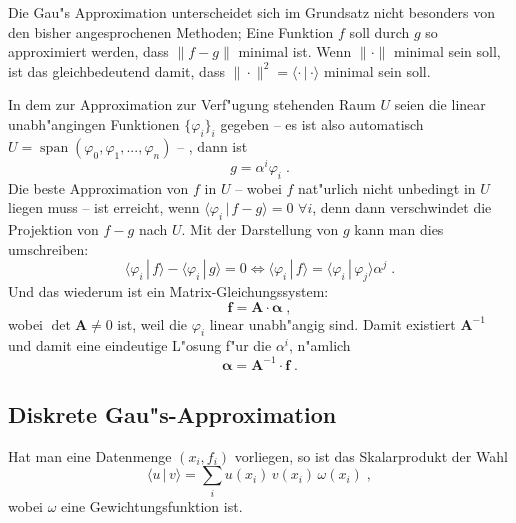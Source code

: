 \documentclass[a4paper]{book}
\renewcommand{\vec}[1]{\ensuremath{\boldsymbol{#1}}}
\newcommand{\Mat}[1]{\ensuremath{\mathbf{#1}}}
\newcommand{\gdw}{\ensuremath{\Leftrightarrow}}
\begin{document}
Die Gau"s Approximation unterscheidet sich im Grundsatz nicht
besonders von den bisher angesprochenen Methoden; Eine Funktion $f$
soll durch $g$ so approximiert werden, dass $\|f-g\|$ minimal
ist. Wenn $\|\cdot\|$ minimal sein soll, ist das gleichbedeutend
damit, dass $\|\cdot\|^2 = \langle \cdot \,|\,\cdot  \rangle$ minimal
sein soll.

In dem zur Approximation zur Verf"ugung stehenden Raum $U$ seien die
linear unabh"angingen Funktionen $\{\varphi_i\}_i$ gegeben -- es ist
also automatisch $U = \operatorname{span}(\varphi_0,\varphi_1, ..., \varphi_n)$
-- , dann ist
\begin{equation*}
  g = \alpha^i \varphi_i \;.
\end{equation*}
Die beste Approximation von $f$ in $U$ -- wobei $f$ nat"urlich nicht
unbedingt in $U$ liegen muss -- ist erreicht, wenn $\langle \varphi_i
\,|\, f-g  \rangle = 0$ $\forall i$, denn dann verschwindet die Projektion von
$f-g$ nach $U$. Mit der Darstellung von $g$ kann man dies umschreiben:
\begin{equation}
  \label{eq:40}
  \langle \varphi_i \,|\, f \rangle - \langle \varphi_i \,|\,g\rangle
  = 0 \gdw
\langle \varphi_i \,|\, f \rangle = \langle \varphi_i \,|\, \varphi_j
\rangle \alpha^j \;.
\end{equation}
Und das wiederum ist ein Matrix-Gleichungssystem:
\begin{equation*}
  \vec f = \Mat A \cdot \vec \alpha \;,
\end{equation*}
wobei $\det\Mat A \neq 0$ ist, weil die $\varphi_i$ linear unabh"angig
sind. Damit existiert $\Mat A^{-1}$ und damit eine eindeutige L"osung
f"ur die $\alpha^i$, n"amlich
\begin{equation*}
  \vec \alpha = \Mat A^{-1} \cdot \vec f \;.
\end{equation*}



\subsection{Diskrete Gau"s-Approximation}
\label{sec:diskrete_gaus_approximation}

Hat man eine Datenmenge $(x_i, f_i)$ vorliegen, so ist das
Skalarprodukt der Wahl
\begin{equation}
  \label{eq:41}
  \langle u \,|\, v \rangle = \sum_{i} u(x_i) \, v(x_i) \, \omega(x_i) \;,
\end{equation}
wobei $\omega$ eine Gewichtungsfunktion ist.
\end{document}
